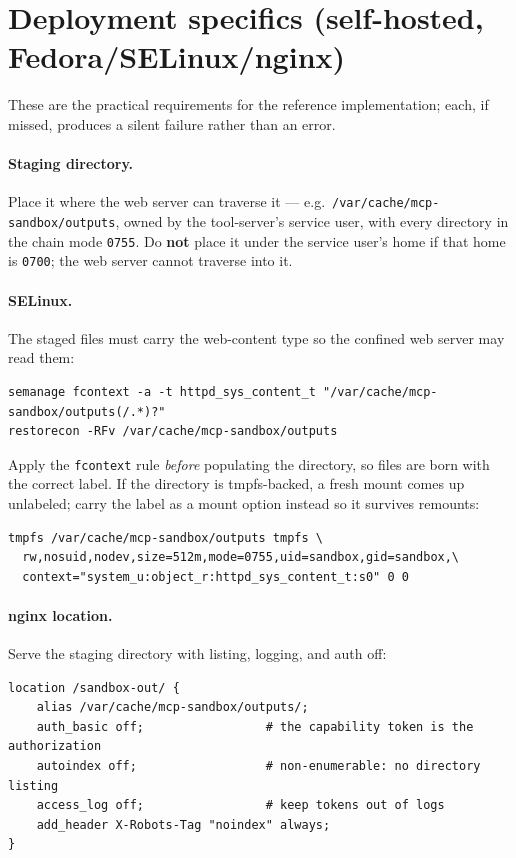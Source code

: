 \documentclass[11pt]{article}
\begin{document}
\section{Deployment specifics (self-hosted, Fedora/SELinux/nginx)}\label{app:deploy}

These are the practical requirements for the reference implementation; each, if missed, produces a silent failure rather than an error.

\paragraph{Staging directory.} Place it where the web server can traverse it --- e.g.\ \texttt{/var/cache/mcp-sandbox/outputs}, owned by the tool-server's service user, with every directory in the chain mode \texttt{0755}. Do \textbf{not} place it under the service user's home if that home is \texttt{0700}; the web server cannot traverse into it.

\paragraph{SELinux.} The staged files must carry the web-content type so the confined web server may read them:
\begin{lstlisting}[style=code]
semanage fcontext -a -t httpd_sys_content_t "/var/cache/mcp-sandbox/outputs(/.*)?"
restorecon -RFv /var/cache/mcp-sandbox/outputs
\end{lstlisting}
Apply the \texttt{fcontext} rule \emph{before} populating the directory, so files are born with the correct label. If the directory is tmpfs-backed, a fresh mount comes up unlabeled; carry the label as a mount option instead so it survives remounts:
\begin{lstlisting}[style=code]
tmpfs /var/cache/mcp-sandbox/outputs tmpfs \
  rw,nosuid,nodev,size=512m,mode=0755,uid=sandbox,gid=sandbox,\
  context="system_u:object_r:httpd_sys_content_t:s0" 0 0
\end{lstlisting}

\paragraph{nginx location.} Serve the staging directory with listing, logging, and auth off:
\begin{lstlisting}[style=code]
location /sandbox-out/ {
    alias /var/cache/mcp-sandbox/outputs/;
    auth_basic off;                 # the capability token is the authorization
    autoindex off;                  # non-enumerable: no directory listing
    access_log off;                 # keep tokens out of logs
    add_header X-Robots-Tag "noindex" always;
}
\end{lstlisting}
\end{document}
